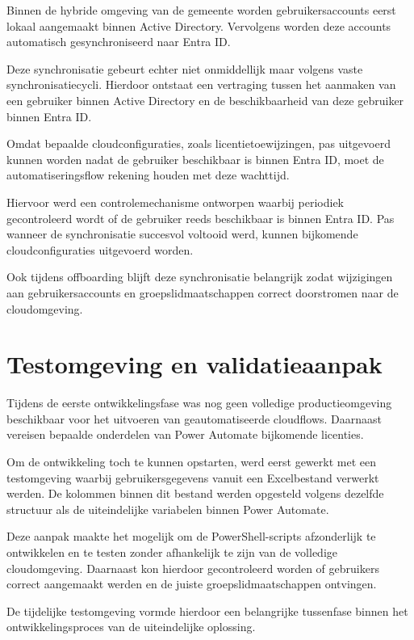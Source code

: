 Binnen de hybride omgeving van de gemeente worden gebruikersaccounts eerst lokaal aangemaakt binnen Active Directory. Vervolgens worden deze accounts automatisch gesynchroniseerd naar Entra ID.

Deze synchronisatie gebeurt echter niet onmiddellijk maar volgens vaste synchronisatiecycli. Hierdoor ontstaat een vertraging tussen het aanmaken van een gebruiker binnen Active Directory en de beschikbaarheid van deze gebruiker binnen Entra ID.

Omdat bepaalde cloudconfiguraties, zoals licentietoewijzingen, pas uitgevoerd kunnen worden nadat de gebruiker beschikbaar is binnen Entra ID, moet de automatiseringsflow rekening houden met deze wachttijd.

Hiervoor werd een controlemechanisme ontworpen waarbij periodiek gecontroleerd wordt of de gebruiker reeds beschikbaar is binnen Entra ID. Pas wanneer de synchronisatie succesvol voltooid werd, kunnen bijkomende cloudconfiguraties uitgevoerd worden.

Ook tijdens offboarding blijft deze synchronisatie belangrijk zodat wijzigingen aan gebruikersaccounts en groepslidmaatschappen correct doorstromen naar de cloud\-om\-ge\-ving.

\section{Testomgeving en validatieaanpak}

Tijdens de eerste ontwikkelingsfase was nog geen volledige productieomgeving beschikbaar voor het uitvoeren van geautomatiseerde cloudflows. Daarnaast vereisen bepaalde onderdelen van Power Automate bijkomende licenties.

Om de ontwikkeling toch te kunnen opstarten, werd eerst gewerkt met een testomgeving waarbij gebruikersgegevens vanuit een Excelbestand verwerkt werden. De kolommen binnen dit bestand werden opgesteld volgens dezelfde structuur als de uiteindelijke variabelen binnen Power Automate.

Deze aanpak maakte het mogelijk om de PowerShell-scripts afzonderlijk te ontwikkelen en te testen zonder afhankelijk te zijn van de volledige cloudomgeving. Daarnaast kon hierdoor gecontroleerd worden of gebruikers correct aangemaakt werden en de juiste groepslidmaatschappen ontvingen.

De tijdelijke testomgeving vormde hierdoor een belangrijke tussenfase binnen het ontwikkelingsproces van de uiteindelijke oplossing.




